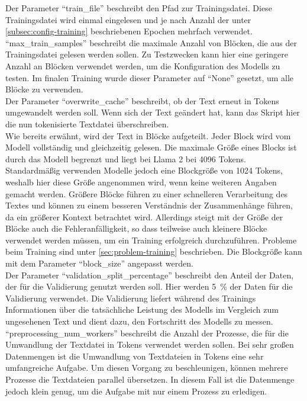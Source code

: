 Der Parameter \enquote{train\_file} beschreibt den Pfad zur Trainingsdatei.
Diese Trainingsdatei wird einmal eingelesen und je nach Anzahl der unter \cref{subsec:config-training} beschriebenen Epochen mehrfach verwendet.\\

\enquote{max\_train\_samples} beschreibt die maximale Anzahl von Blöcken, die aus der Trainingsdatei gelesen werden sollen.
Zu Testzwecken kann hier eine geringere Anzahl an Blöcken verwendet werden, um die Konfiguration des Modells zu testen.
Im finalen Training wurde dieser Parameter auf \enquote{None} gesetzt, um alle Blöcke zu verwenden.\\

Der Parameter \enquote{overwrite\_cache} beschreibt, ob der Text erneut in Tokens umgewandelt werden soll.
Wenn sich der Text geändert hat, kann das Skript hier die nun tokenisierte Textdatei überschreiben.\\

Wie bereits erwähnt, wird der Text in Blöcke aufgeteilt.
Jeder Block wird vom Modell vollständig und gleichzeitig gelesen.
Die maximale Größe eines Blocks ist durch das Modell begrenzt und liegt bei Llama 2 bei 4096 Tokens.
Standardmäßig verwenden Modelle jedoch eine Blockgröße von 1024 Tokens, weshalb hier diese Größe angenommen wird, wenn keine weiteren Angaben gemacht werden.
Größere Blöcke führen zu einer schnelleren Verarbeitung des Textes und können zu einem besseren Verständnis der Zusammenhänge führen, da ein größerer Kontext betrachtet wird.
Allerdings steigt mit der Größe der Blöcke auch die Fehleranfälligkeit, so dass teilweise auch kleinere Blöcke verwendet werden müssen, um ein Training erfolgreich durchzuführen.
Probleme beim Training sind unter \cref{sec:problem-training} beschrieben.
Die Blockgröße kann mit dem Parameter \enquote{block\_size} angepasst werden.\\

Der Parameter \enquote{validation\_split\_percentage} beschreibt den Anteil der Daten, der für die Validierung genutzt werden soll.
Hier werden \SI{5}{\percent} der Daten für die Validierung verwendet.
Die Validierung liefert während des Trainings Informationen über die tatsächliche Leistung des Modells im Vergleich zum ungesehenen Text und dient dazu, den Fortschritt des Modells zu messen.\\

\enquote{preprocessing\_num\_workers} beschreibt die Anzahl der Prozesse, die für die Umwandlung der Textdatei in Tokens verwendet werden sollen.
Bei sehr großen Datenmengen ist die Umwandlung von Textdateien in Tokens eine sehr umfangreiche Aufgabe.
Um diesen Vorgang zu beschleunigen, können mehrere Prozesse die Textdateien parallel übersetzen.
In diesem Fall ist die Datenmenge jedoch klein genug, um die Aufgabe mit nur einem Prozess zu erledigen.\\

